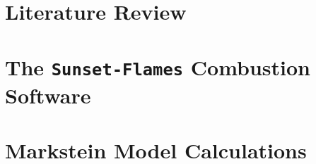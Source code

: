 \documentclass[lmr,second,hyperref,rgb,hyperref,dvipsnames]{uom_thesis_casson}
\begin{document}
\makeatletter
\title{\xmp@Title}
\author{\xmp@Author}
\makeatother

\maketitle




\uomtoc


\uomstartmainbody %


\chapter{Literature Review} \label{ch:lit-review}


\chapter{The \texttt{Sunset-Flames} Combustion Software} \label{ch:sunset}


\chapter{Markstein Model Calculations} \label{ch:markstein}


% 

% 

% 


\printbibliography[title={References},heading=bibintoc]
\end{document}
